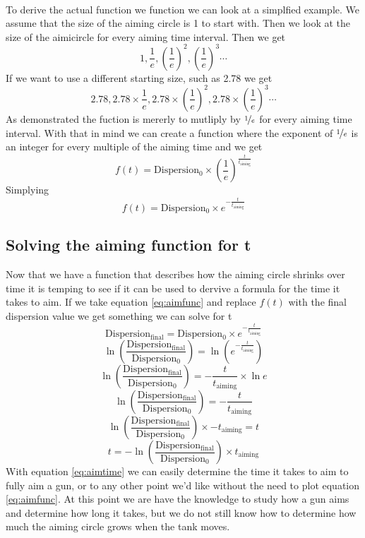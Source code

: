\documentclass{article}
\begin{document}
\paragraph{}To derive the actual function we function we can look at a simplfied example.
We assume that the size of the aiming circle is 1 to start with. Then we look at the size of the aimicircle
for every aiming time interval. Then we get \[1, \frac{1}{e}, \left(\frac{1}{e}\right)^2, \left(\frac{1}{e}\right)^3 \cdots\]
If we want to use a different starting size, such as 2.78 we get
\[2.78, 2.78\times\frac{1}{e}, 2.78\times\left(\frac{1}{e}\right)^2, 2.78\times\left(\frac{1}{e}\right)^3 \cdots\]
As demonstrated the fuction is mererly to mutliply by \(\nicefrac{1}{e}\) for every aiming time interval.
With that in mind we can create a function where the exponent of \(\nicefrac{1}{e}\) is an integer for every multiple of the aiming time
and we get 
\[f\left(t\right) = \mathrm{Dispersion_0} \times \left(\frac{1}{e}\right)^{\frac{t}{t_{\mathrm{aiming}}}}\]
Simplying
\begin{equation}
    f\left(t\right) = \mathrm{Dispersion_0} \times e^{-\frac{t}{t_{\mathrm{aiming}}}}
    \label{eq:aimfunc}
\end{equation}
\subsection{Solving the aiming function for t}
Now that we have a function that describes how the aiming circle shrinks over time
it is temping to see if it can be used to dervive a formula for the time it takes to aim.
If we take equation \eqref{eq:aimfunc} and replace \(f(t)\)  with the final dispersion value we get something we can solve for t
\[\mathrm{Dispersion_{final}} = \mathrm{Dispersion_0} \times e^{-\frac{t}{t_{\mathrm{aiming}}}}\]
\[\ln \left(\frac{\mathrm{Dispersion_{final}}}{\mathrm{Dispersion_0}} \right) = \ln\left( e^{-\frac{t}{t_{\mathrm{aiming}}}}\right)\]
\[\ln \left(\frac{\mathrm{Dispersion_{final}}}{\mathrm{Dispersion_0}}\right) = -\frac{t}{t_{\mathrm{aiming}}} \times \ln e\]
\[\ln \left(\frac{\mathrm{Dispersion_{final}}}{\mathrm{Dispersion_0}}\right) = -\frac{t}{t_{\mathrm{aiming}}}\]
\[\ln \left(\frac{\mathrm{Dispersion_{final}}}{\mathrm{Dispersion_0}} \right) \times -t_{\mathrm{aiming}} = t\]
\begin{equation}
    \label{eq:aimtime}
    t = - \ln \left(\frac{\mathrm{Dispersion_{final}}}{\mathrm{Dispersion_0}} \right) \times t_{\mathrm{aiming}}
\end{equation}
With equation \eqref{eq:aimtime} we can easily determine the time it takes to aim to fully aim a gun, or to any other point we'd like without the need
to plot equation \eqref{eq:aimfunc}. At this point we are have the knowledge to study how a gun aims and determine how long it takes, but 
we do not still know how to determine how much the aiming circle grows when the tank moves.
\end{document}
